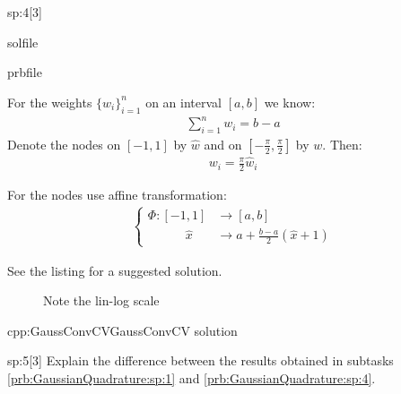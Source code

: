 \begin{samproblem}
\begin{subproblem}{sp:4}[3]
\begin{samwriteprbpart}{solfile}
\begin{writeverbatim}{prbfile}
\begin{samsolution}
        For the weights $\{w_i\}_{i=1}^n$ on an interval $[a,b]$ we know:
        \begin{align}
          \sum_{i=1}^n w_i = b - a
        \end{align}
        Denote the nodes on $[-1,1]$ by $\hat{w}$ and on $[-\frac{\pi}{2}, \frac{\pi}{2}]$ by $w$.
        Then:
        \begin{align}
          w_i = \frac{\pi}{2} \hat{w}_i
        \end{align}

        For the nodes use affine transformation:
        \begin{align}
          \begin{cases}
            \Phi: [-1,1] &\rightarrow [a,b] \\
            \quad \quad \quad \hat{x} &\rightarrow a + \frac{b-a}{2} (\hat{x} + 1)
          \end{cases}
        \end{align}

        See the listing for a suggested solution.
        \begin{figure}
          \centering 
          \caption{Note the lin-log scale}
        \end{figure}

        \begin{samcode}[C++-code]{cpp:GaussConvCV}{GaussConvCV solution}
          \small
          
        \end{samcode}
      \end{samsolution}
    \end{writeverbatim}
  \end{samwriteprbpart}

\end{subproblem}

\begin{subproblem}{sp:5}[3]
Explain the difference between the results obtained in subtasks \ref{prb:GaussianQuadrature:sp:1} and \ref{prb:GaussianQuadrature:sp:4}.


\end{subproblem}
\end{samproblem}
